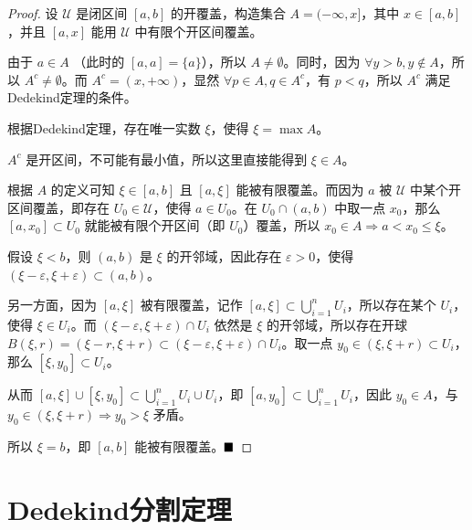 \begin{proof}
    设 $\mathcal{U}$ 是闭区间 $[a,b]$ 的开覆盖，构造集合 $A = (-\infty, x]$，其中 $x \in [a,b]$，并且 $[a,x]$ 能用 $\mathcal{U}$ 中有限个开区间覆盖。
    
    由于 $a \in A$ （此时的 $[a,a] = \{a\}$），所以 $A \neq \emptyset$。同时，因为 $\forall y > b, y \notin A$，所以 $A^c \neq \emptyset$。而 $A^c = (x, +\infty)$，显然 $\forall p \in A, q \in A^c$，有 $p < q$，所以 $A^c$ 满足Dedekind定理的条件。
    
    根据Dedekind定理，存在唯一实数 $\xi$，使得 $\xi = \max A$。
    
    $A^c$ 是开区间，不可能有最小值，所以这里直接能得到 $\xi \in A$。
    
    根据 $A$ 的定义可知 $\xi \in [a,b]$ 且 $[a,\xi]$ 能被有限覆盖。而因为 $a$ 被 $\mathcal{U}$ 中某个开区间覆盖，即存在 $U_0 \in \mathcal{U}$，使得 $a \in U_0$。在 $U_0 \cap (a,b)$ 中取一点 $x_0$，那么 $[a,x_0] \subset U_0$ 就能被有限个开区间（即 $U_0$）覆盖，所以 $x_0 \in A \Rightarrow a < x_0 \leq \xi$。
    
    假设 $\xi < b$，则 $(a,b)$ 是 $\xi$ 的开邻域，因此存在 $\varepsilon > 0$，使得 $(\xi - \varepsilon, \xi + \varepsilon) \subset (a,b)$。
    
    另一方面，因为 $[a,\xi]$ 被有限覆盖，记作 $[a,\xi] \subset \bigcup_{i=1}^n U_i$，所以存在某个 $U_i$，使得 $\xi \in U_i$。而 $(\xi - \varepsilon, \xi + \varepsilon) \cap U_i$ 依然是 $\xi$ 的开邻域，所以存在开球 $B(\xi, r) = (\xi - r, \xi + r) \subset (\xi - \varepsilon, \xi + \varepsilon) \cap U_i$。取一点 $y_0 \in (\xi, \xi + r) \subset U_i$，那么 $[\xi, y_0] \subset U_i$。
    
    从而 $[a,\xi] \cup [\xi, y_0] \subset \bigcup_{i=1}^n U_i \cup U_i$，即 $[a,y_0] \subset \bigcup_{i=1}^n U_i$，因此 $y_0 \in A$，与 $y_0 \in (\xi, \xi + r) \Rightarrow y_0 > \xi$ 矛盾。
    
    所以 $\xi = b$，即 $[a,b]$ 能被有限覆盖。$\hfill \blacksquare$
\end{proof}
    


\newpage
\section{Dedekind分割定理}

